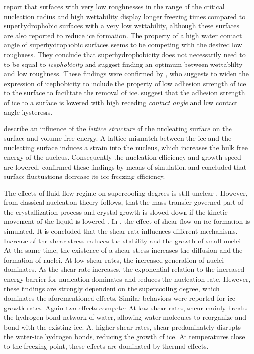 \cite{jung_are_2011} report that surfaces with very low roughnesses in the range of the critical nucleation radius and high wettability display longer freezing times compared to superhydrophobic surfaces with a very low wettability, although these surfaces are also reported to reduce ice formation. The property of a high water contact angle of superhydrophobic surfaces seems to be competing with the desired low roughness. They conclude that superhydrophobicity does not necessarily need to to be equal to \emph{icephobicity} and suggest finding an optimum between wettablilty and low roughness. 
These findings were confirmed by \cite{hejazi_superhydrophobicity_2013}, who suggests to widen the expression of icephobicity to include the property of low adhesion strength of ice to the surface to facilitate the removal of ice. \cite{janjua_performance_2017} suggest that the adhesion strength of ice to a surface is lowered with high receding \emph{contact angle} and low contact angle hysteresis.

\cite{kauffeld_handbooks_2005} describe an influence of the \emph{lattice structure} of the nucleating surface on the surface and volume free energy. A lattice mismatch between the ice and the nucleating surface induces a strain into the nucleus, which increases the bulk free energy of the nucleus. Consequently the nucleation efficiency and growth speed are lowered. \cite{qiu_ice_2017} confirmed these findings by means of simulation and concluded that surface fluctuations decrease its ice-freezing efficiency.  

The effects of fluid flow regime on supercooling degrees is still unclear \citep{kauffeld_ice_2019}. 
However, from classical nucleation theory follows, that the mass transfer governed part of the crystallization process and crystal growth is slowed down if the kinetic movement of the liquid is lowered \cite{ronceray_suppression_2017, turnbull_rate_1949, kelton_nucleation_2010}.
In \cite{Luo_homogeneous_2020,Luo_ice_2019}, the effect of shear flow on ice formation is simulated. It is concluded that the shear rate influences different mechanisms. Increase of the shear stress reduces the stability  and the growth of small nuclei. At the same time, the existence of a shear stress increases the diffusion and the formation of nuclei. At low shear rates, the increased generation of nuclei dominates. As the shear rate increases, the exponential relation to the increased energy barrier for nucleation dominates and reduces the nucleation rate. However, these findings are strongly dependent on the supercooling degree, which dominates the aforementioned effects. Similar behaviors were reported for ice growth rates. Again two effects compete: At low shear rates, shear mainly breaks the hydrogen bond network of water, allowing water molecules to reorganize and bond with the existing ice. At higher shear rates, shear predominately disrupts the water-ice hydrogen bonds, reducing the growth of ice. At temperatures close to the freezing point, these effects are dominated by thermal effects.



